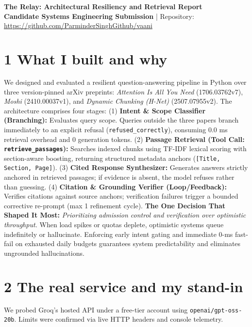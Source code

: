 \documentclass[8.5pt,a4paper]{article}
\begin{document}
\fontsize{7.6}{8.6}\selectfont

\begin{center}
    {\normalsize\bfseries\color{navy}The Relay: Architectural Resiliency and Retrieval Report}\\[-1pt]
    {\scriptsize\textbf{Candidate Systems Engineering Submission} \quad | \quad Repository: \url{https://github.com/ParminderSinghGithub/vaani}}
\end{center}
\vspace{-6pt}

\section*{1 What I built and why}
We designed and evaluated a resilient question-answering pipeline in Python over three version-pinned arXiv preprints: \textit{Attention Is All You Need} (1706.03762v7), \textit{Moshi} (2410.00037v1), and \textit{Dynamic Chunking (H-Net)} (2507.07955v2).
The architecture comprises four stages:
(1) \textbf{Intent \& Scope Classifier (Branching):} Evaluates query scope. Queries outside the three papers branch immediately to an explicit refusal (\texttt{refused\_correctly}), consuming 0.0 ms retrieval overhead and 0 generation tokens.
(2) \textbf{Passage Retrieval (Tool Call: \texttt{retrieve\_passages}):} Searches indexed chunks using TF-IDF lexical scoring with section-aware boosting, returning structured metadata anchors (\texttt{[Title, Section, Page]}).
(3) \textbf{Cited Response Synthesizer:} Generates answers strictly anchored in retrieved passages; if evidence is absent, the model refuses rather than guessing.
(4) \textbf{Citation \& Grounding Verifier (Loop/Feedback):} Verifies citations against source anchors; verification failures trigger a bounded corrective re-prompt (max 1 refinement cycle).
\textbf{The One Decision That Shaped It Most:} \textit{Prioritizing admission control and verification over optimistic throughput.} When load spikes or quotas deplete, optimistic systems queue indefinitely or hallucinate. Enforcing early intent gating and immediate 0-ms fast-fail on exhausted daily budgets guarantees system predictability and eliminates ungrounded hallucinations.

\section*{2 The real service and my stand-in}
We probed Groq's hosted API under a free-tier account using \texttt{openai/gpt-oss-20b}. Limits were confirmed via live HTTP headers and console telemetry.
\end{document}
